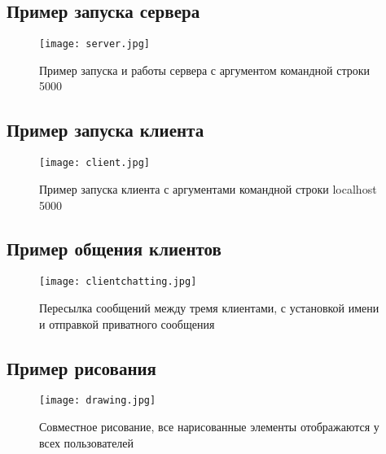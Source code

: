 \documentclass{article}
\begin{document}
\subsection{Пример запуска сервера}
\begin{figure}[H]
	\begin{flushleft}
		\centerline{\texttt{[image: server.jpg]}}
		\caption{Пример запуска и работы сервера с аргументом командной строки 5000}
	\end{flushleft}
\end{figure}
\vspace{3cm}

\subsection{Пример запуска клиента}
\begin{figure}[H]
	\begin{flushleft}
		\centerline{\texttt{[image: client.jpg]}}
		\caption{Пример запуска клиента с аргументами командной строки localhost 5000}
	\end{flushleft}
\end{figure}

\subsection{Пример общения клиентов}
\begin{figure}[H]
	\begin{flushleft}
		\centerline{\texttt{[image: clientchatting.jpg]}}
		\caption{Пересылка сообщений между тремя клиентами, с установкой имени и отправкой приватного сообщения}
	\end{flushleft}
\end{figure}

\subsection{Пример рисования}
\begin{figure}[H]
	\begin{flushleft}
		\centerline{\texttt{[image: drawing.jpg]}}
		\caption{Совместное рисование, все нарисованные элементы отображаются у всех пользователей}
	\end{flushleft}
\end{figure}
\end{document}
